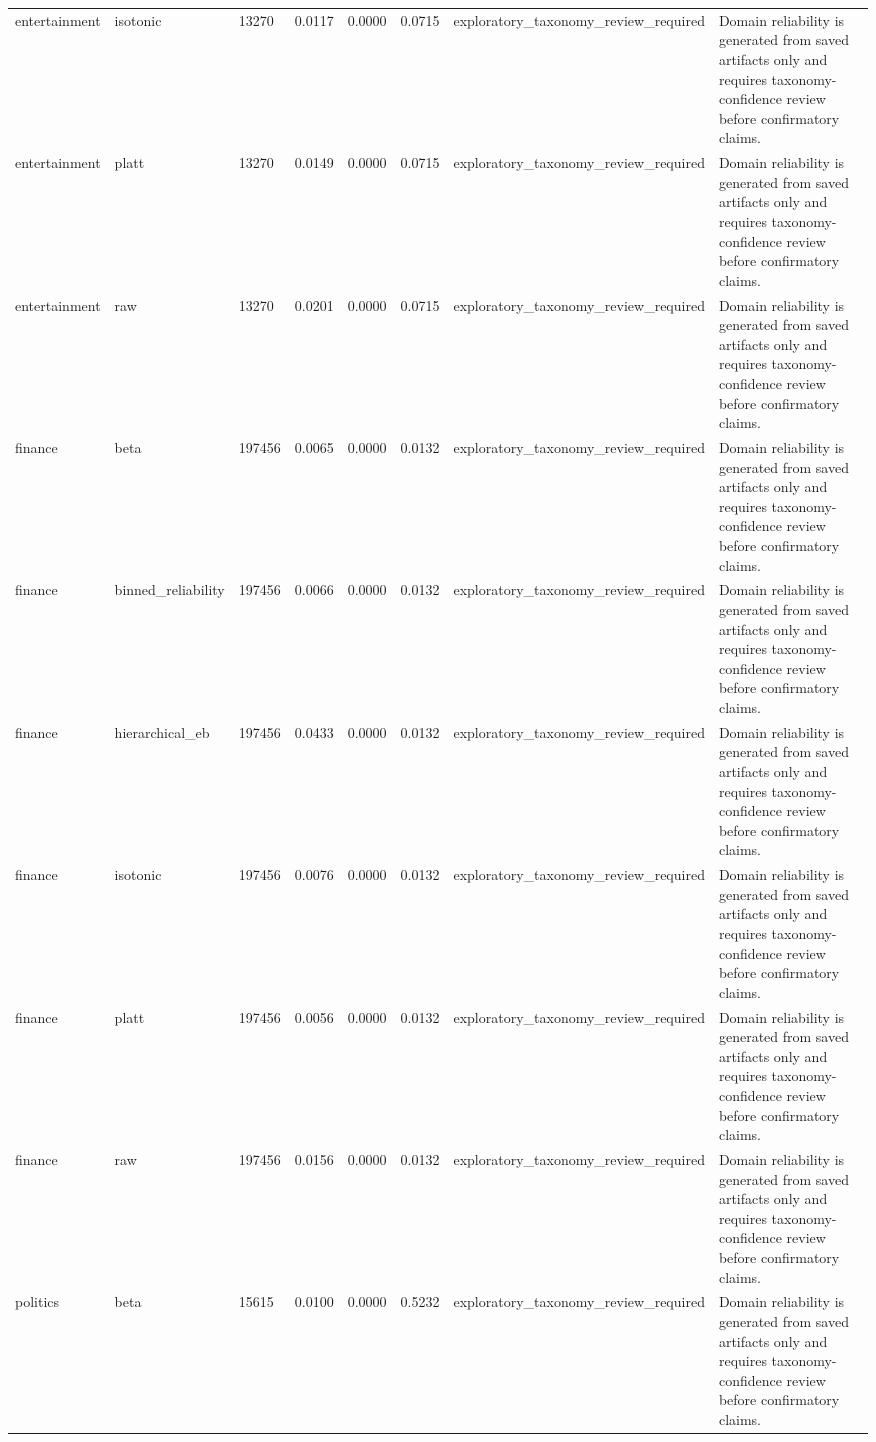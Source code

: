 \begin{tabular}{llllllll}
entertainment & isotonic & 13270 & 0.0117 & 0.0000 & 0.0715 & exploratory\_taxonomy\_review\_required & Domain reliability is generated from saved artifacts only and requires taxonomy-confidence review before confirmatory claims. \\
entertainment & platt & 13270 & 0.0149 & 0.0000 & 0.0715 & exploratory\_taxonomy\_review\_required & Domain reliability is generated from saved artifacts only and requires taxonomy-confidence review before confirmatory claims. \\
entertainment & raw & 13270 & 0.0201 & 0.0000 & 0.0715 & exploratory\_taxonomy\_review\_required & Domain reliability is generated from saved artifacts only and requires taxonomy-confidence review before confirmatory claims. \\
finance & beta & 197456 & 0.0065 & 0.0000 & 0.0132 & exploratory\_taxonomy\_review\_required & Domain reliability is generated from saved artifacts only and requires taxonomy-confidence review before confirmatory claims. \\
finance & binned\_reliability & 197456 & 0.0066 & 0.0000 & 0.0132 & exploratory\_taxonomy\_review\_required & Domain reliability is generated from saved artifacts only and requires taxonomy-confidence review before confirmatory claims. \\
finance & hierarchical\_eb & 197456 & 0.0433 & 0.0000 & 0.0132 & exploratory\_taxonomy\_review\_required & Domain reliability is generated from saved artifacts only and requires taxonomy-confidence review before confirmatory claims. \\
finance & isotonic & 197456 & 0.0076 & 0.0000 & 0.0132 & exploratory\_taxonomy\_review\_required & Domain reliability is generated from saved artifacts only and requires taxonomy-confidence review before confirmatory claims. \\
finance & platt & 197456 & 0.0056 & 0.0000 & 0.0132 & exploratory\_taxonomy\_review\_required & Domain reliability is generated from saved artifacts only and requires taxonomy-confidence review before confirmatory claims. \\
finance & raw & 197456 & 0.0156 & 0.0000 & 0.0132 & exploratory\_taxonomy\_review\_required & Domain reliability is generated from saved artifacts only and requires taxonomy-confidence review before confirmatory claims. \\
politics & beta & 15615 & 0.0100 & 0.0000 & 0.5232 & exploratory\_taxonomy\_review\_required & Domain reliability is generated from saved artifacts only and requires taxonomy-confidence review before confirmatory claims. \\

\end{tabular}
